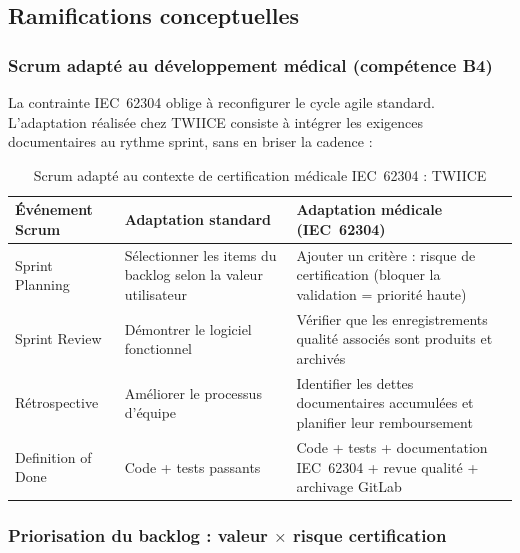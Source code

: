 \subsection{Ramifications conceptuelles}

\subsubsection*{Scrum adapté au développement médical (compétence B4)}

La contrainte IEC~62304 oblige à reconfigurer le cycle agile standard. L'adaptation réalisée chez TWIICE consiste à intégrer les exigences documentaires au rythme sprint, sans en briser la cadence :

\begin{table}[h!]
  \centering\small
  \begin{tabularx}{\textwidth}{|p{3.2cm}|X|X|}
    \hline
    \textbf{Événement Scrum} & \textbf{Adaptation standard} & \textbf{Adaptation médicale (IEC~62304)} \\
    \hline
    Sprint Planning
      & Sélectionner les items du backlog selon la valeur utilisateur
      & Ajouter un critère : risque de certification (bloquer la validation = priorité haute) \\
    \hline
    Sprint Review
      & Démontrer le logiciel fonctionnel
      & Vérifier que les enregistrements qualité associés sont produits et archivés \\
    \hline
    Rétrospective
      & Améliorer le processus d'équipe
      & Identifier les dettes documentaires accumulées et planifier leur remboursement \\
    \hline
    Definition of Done
      & Code + tests passants
      & Code + tests + documentation IEC~62304 + revue qualité + archivage GitLab \\
    \hline
  \end{tabularx}
  \caption{Scrum adapté au contexte de certification médicale IEC~62304 : TWIICE}
  \label{tab:scrum-medical}
\end{table}

\subsubsection*{Priorisation du backlog : valeur $\times$ risque certification}

